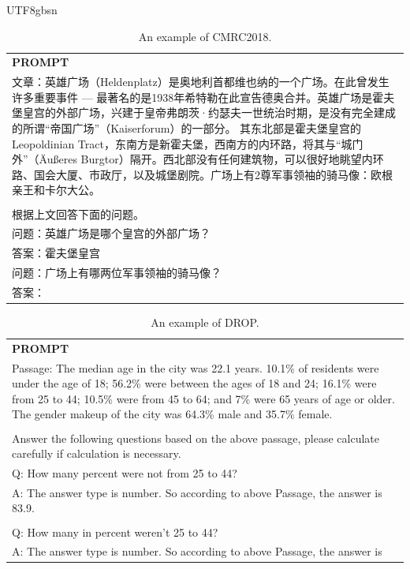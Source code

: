 \documentclass[11pt, a4paper, logo, copyright, nonumbering]{deepseek}
\begin{document}
\begin{CJK*}{UTF8}{gbsn}
\begin{table}[ht]
    \centering \small
\begin{tabular}{p{12cm}}
\toprule
\textbf{PROMPT}\\
文章：英雄广场（Heldenplatz）是奥地利首都维也纳的一个广场。在此曾发生许多重要事件 — 最著名的是1938年希特勒在此宣告德奥合并。英雄广场是霍夫堡皇宫的外部广场，兴建于皇帝弗朗茨·约瑟夫一世统治时期，是没有完全建成的所谓“帝国广场”（Kaiserforum）的一部分。 其东北部是霍夫堡皇宫的 Leopoldinian Tract，东南方是新霍夫堡，西南方的内环路，将其与“城门外”（Äußeres Burgtor）隔开。西北部没有任何建筑物，可以很好地眺望内环路、国会大厦、市政厅，以及城堡剧院。广场上有2尊军事领袖的骑马像：欧根亲王和卡尔大公。
\\
\\根据上文回答下面的问题。
\\问题：英雄广场是哪个皇宫的外部广场？
\\答案：霍夫堡皇宫
\\问题：广场上有哪两位军事领袖的骑马像？
\\答案：\\
\bottomrule
\end{tabular}
    \caption{\centering An example of CMRC2018.}
    \label{tab:cmrc2018_eval_format_example}
\end{table}

\begin{table}[ht]
    \centering \small
\begin{tabular}{p{12cm}}
\toprule
\textbf{PROMPT}\\
Passage: The median age in the city was 22.1 years. 10.1\% of residents were under the age of 18; 56.2\% were between the ages of 18 and 24; 16.1\% were from 25 to 44; 10.5\% were from 45 to 64; and 7\% were 65 years of age or older. The gender makeup of the city was 64.3\% male and 35.7\% female.
\\
\\Answer the following questions based on the above passage, please calculate carefully if calculation is necessary.
\\Q: How many percent were not from 25 to 44?
\\A: The answer type is number. So according to above Passage, the answer is 83.9.
\\
\\Q: How many in percent weren't 25 to 44?
\\A: The answer type is number. So according to above Passage, the answer is\\
\bottomrule
\end{tabular}
    \caption{\centering An example of DROP.}
    \label{tab:drop_eval_format_example}
\end{table}


\end{CJK*}
\end{document}
